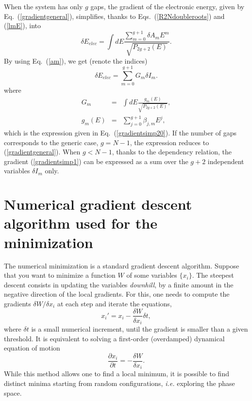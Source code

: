 \documentclass[]{revtex4-1}
\begin{document}
When the system has only $g$ gaps, the gradient of the electronic energy, given by Eq.~(\ref{gradientgeneral}), simplifies, thanks to Eqs.~(\ref{R2Ndoubleroots}) and (\ref{lmE}), into 
\begin{equation}
\delta E_{elec} =   \int dE \frac{ \sum_{m=0}^{g+1} \delta A_m E^m  }{\sqrt{P_{2g+2}(E)}}.  
\end{equation}
By using Eq.~(\ref{am}), we get (renote the indices)
\begin{equation}
\delta E_{elec} =  \sum_{m=0}^{g+1} G_m  \delta I_m.  \label{gradientsimp1}
\end{equation}
where
\begin{eqnarray}
  G_m &=& \int dE \frac{ g_m(E)  }{\sqrt{P_{2g+2}(E)}}, \label{gradientsimp2} \\
  g_m(E) &=& \sum_{j=0}^{g+1}  \beta_{j,m}   E^j,
  \end{eqnarray}
which is the expression given in Eq.~(\ref{gradientsimp20}).
If the number of gaps corresponds to the generic case, $g=N-1$, the expression reduces to (\ref{gradientgeneral}). When $g<N-1$, thanks to the dependency relation, the gradient (\ref{gradientsimp1}) can be expressed as a sum over the $g+2$ independent variables $\delta I_m$ only.

 \section{Numerical gradient descent algorithm used for the minimization}
 \label{appDescent}
 
 The numerical minimization is a standard gradient descent algorithm. Suppose that you want to minimize a function $W$ of some variables $\{x_i\}$. The steepest descent consists in updating the variables \textit{downhill}, by a finite amount in the negative direction of the local gradients. For this, one needs to compute the gradients $\delta W/\delta x_i$ at each step and iterate the equations,
\begin{equation}
x_i'=x_i-\frac{\delta W}{\delta x_i} \delta t,
\end{equation}
where $\delta t$ is a small numerical increment, until the gradient is smaller than a given threshold.
 It is equivalent to solving a first-order (overdamped) dynamical equation of motion
\begin{equation}
\frac{\partial x_i}{\partial t} =-\frac{\delta W}{\delta x_i}.
\end{equation}
While this method allows one to find a local minimum, it is possible to find distinct minima starting from random configurations, \textit{i.e.} exploring the phase space.
\end{document}
